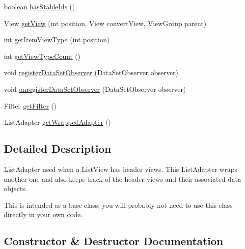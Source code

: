 \begin{DoxyCompactItemize}
\item 
boolean \hyperlink{classit_1_1sephiroth_1_1android_1_1library_1_1widget_1_1_header_view_list_adapter_a2c51278ae702b0f098d0f2b6103b6fe7}{has\+Stable\+Ids} ()
\item 
View \hyperlink{classit_1_1sephiroth_1_1android_1_1library_1_1widget_1_1_header_view_list_adapter_a32e701520e6d04eae7f57b4c875cfa93}{get\+View} (int position, View convert\+View, View\+Group parent)
\item 
int \hyperlink{classit_1_1sephiroth_1_1android_1_1library_1_1widget_1_1_header_view_list_adapter_ad0bd29937cf87542480a7b92f736b45c}{get\+Item\+View\+Type} (int position)
\item 
int \hyperlink{classit_1_1sephiroth_1_1android_1_1library_1_1widget_1_1_header_view_list_adapter_abb5698c2bb634c936e071d29164b8199}{get\+View\+Type\+Count} ()
\item 
void \hyperlink{classit_1_1sephiroth_1_1android_1_1library_1_1widget_1_1_header_view_list_adapter_aa775475107569b8291f63aea6bace999}{register\+Data\+Set\+Observer} (Data\+Set\+Observer observer)
\item 
void \hyperlink{classit_1_1sephiroth_1_1android_1_1library_1_1widget_1_1_header_view_list_adapter_aba8c89251f4c83ad50e6ffb522740337}{unregister\+Data\+Set\+Observer} (Data\+Set\+Observer observer)
\item 
Filter \hyperlink{classit_1_1sephiroth_1_1android_1_1library_1_1widget_1_1_header_view_list_adapter_a0ba6f2fbbfd43204015fb88697d74a70}{get\+Filter} ()
\item 
List\+Adapter \hyperlink{classit_1_1sephiroth_1_1android_1_1library_1_1widget_1_1_header_view_list_adapter_a05c6eb2422b5bc8bfbbeb480e3d1a376}{get\+Wrapped\+Adapter} ()
\end{DoxyCompactItemize}


\subsection{Detailed Description}
List\+Adapter used when a List\+View has header views. This List\+Adapter wraps another one and also keeps track of the header views and their associated data objects. 

This is intended as a base class; you will probably not need to use this class directly in your own code. 

\subsection{Constructor \& Destructor Documentation}
\mbox{\label{classit_1_1sephiroth_1_1android_1_1library_1_1widget_1_1_header_view_list_adapter_a9a6766671b4b5188dae3ac64fb3f4059}} 

